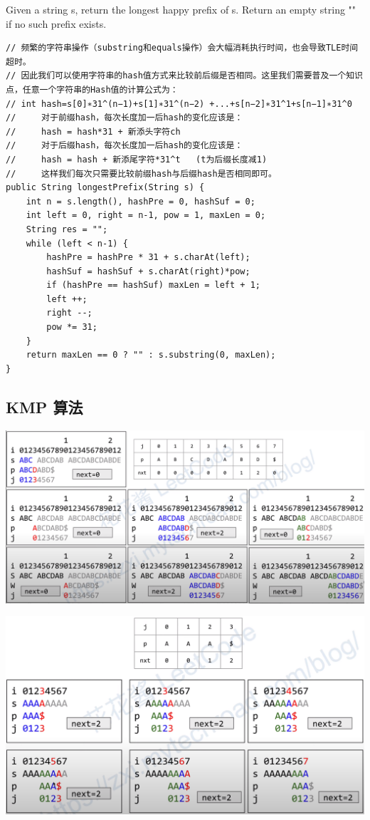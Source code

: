 \documentclass[9pt, b5paaper]{book}
\begin{document}
Given a string s, return the longest happy prefix of s. Return an empty string "" if no such prefix exists.
\begin{verbatim}
// 频繁的字符串操作（substring和equals操作）会大幅消耗执行时间，也会导致TLE时间超时。
// 因此我们可以使用字符串的hash值方式来比较前后缀是否相同。这里我们需要普及一个知识点，任意一个字符串的Hash值的计算公式为：
// int hash=s[0]∗31^(n−1)+s[1]∗31^(n−2) +...+s[n−2]∗31^1+s[n−1]∗31^0
//     对于前缀hash，每次长度加一后hash的变化应该是：
//     hash = hash*31 + 新添头字符ch
//     对于后缀hash，每次长度加一后hash的变化应该是：
//     hash = hash + 新添尾字符*31^t   (t为后缀长度减1)
//     这样我们每次只需要比较前缀hash与后缀hash是否相同即可。
public String longestPrefix(String s) {
    int n = s.length(), hashPre = 0, hashSuf = 0;
    int left = 0, right = n-1, pow = 1, maxLen = 0;
    String res = "";
    while (left < n-1) {
        hashPre = hashPre * 31 + s.charAt(left);
        hashSuf = hashSuf + s.charAt(right)*pow;
        if (hashPre == hashSuf) maxLen = left + 1;
        left ++;
        right --;
        pow *= 31;
    }
    return maxLen == 0 ? "" : s.substring(0, maxLen);
}
\end{verbatim}
\subsection{KMP 算法}
\label{sec-3-3-1}
\includegraphics[width=.9\linewidth]{./pic/kmp.png}

\includegraphics[width=.9\linewidth]{./pic/kmp2.png}
\end{document}
